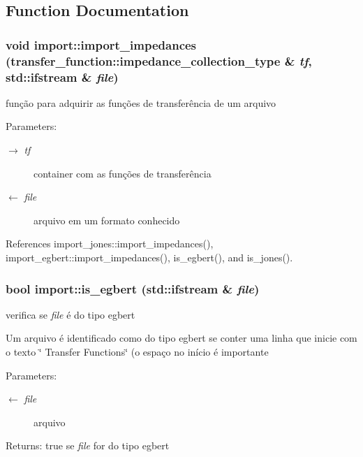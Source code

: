 \subsection{Function Documentation}
\subsubsection{\setlength{\rightskip}{0pt plus 5cm}void import::import\_\-impedances ({\bf transfer\_\-function::impedance\_\-collection\_\-type} \& {\em tf}, \/  std::ifstream \& {\em file})}\label{namespaceimport_c840ffac738fcbb69a16a76457b67ca5}


função para adquirir as funções de transferência de um arquivo 

\begin{Desc}
\item[Parameters:]
\begin{description}
\item[\mbox{$\rightarrow$} {\em tf}]container com as funções de transferência \item[\mbox{$\leftarrow$} {\em file}]arquivo em um formato conhecido \end{description}
\end{Desc}


References import\_\-jones::import\_\-impedances(), import\_\-egbert::import\_\-impedances(), is\_\-egbert(), and is\_\-jones().
\subsubsection{\setlength{\rightskip}{0pt plus 5cm}bool import::is\_\-egbert (std::ifstream \& {\em file})}\label{namespaceimport_6f888d3c8ca5c103c4bdb3e004ba4d8c}


verifica se {\em file\/} é do tipo egbert 

Um arquivo é identificado como do tipo egbert se conter uma linha que inicie com o texto \char`\"{} Transfer Functions\char`\"{} (o espaço no início é importante

\begin{Desc}
\item[Parameters:]
\begin{description}
\item[\mbox{$\leftarrow$} {\em file}]arquivo\end{description}
\end{Desc}
\begin{Desc}
\item[Returns:]true se {\em file\/} for do tipo egbert \end{Desc}


